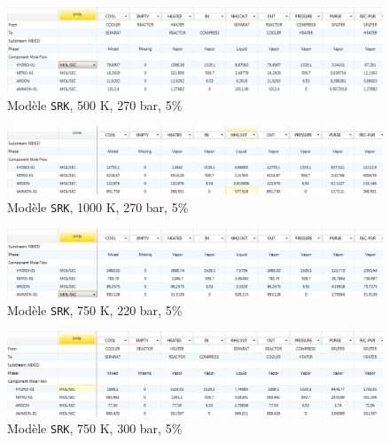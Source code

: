 \documentclass[a4paper, oneside, 12pt]{article}
\begin{document}
\begin{figure}[h!]
	\begin{center}
		\includegraphics[scale=0.5]{SRK,500,270.png}
	\end{center}
	\caption{Modèle \texttt{SRK}, 500 K, 270 bar, 5\%}
	\label{fig:SRK,500,270,0.05}
\end{figure}

\begin{figure}[h!]
	\begin{center}
		\includegraphics[scale=0.5]{SRK,1000,270.png}
	\end{center}
	\caption{Modèle \texttt{SRK}, 1000 K, 270 bar, 5\%}
	\label{fig:SRK,1000,270,0.05}
\end{figure}

\begin{figure}[h!]
	\begin{center}
		\includegraphics[scale=0.5]{SRK,750,220.png}
	\end{center}
	\caption{Modèle \texttt{SRK}, 750 K, 220 bar, 5\%}
	\label{fig:SRK,750,220,0.05}
\end{figure}

\begin{figure}[h!]
	\begin{center}
		\includegraphics[scale=0.5]{SRK,750,300.png}
	\end{center}
	\caption{Modèle \texttt{SRK}, 750 K, 300 bar, 5\%}
	\label{fig:SRK,750,300,0.05}
\end{figure}
\end{document}

